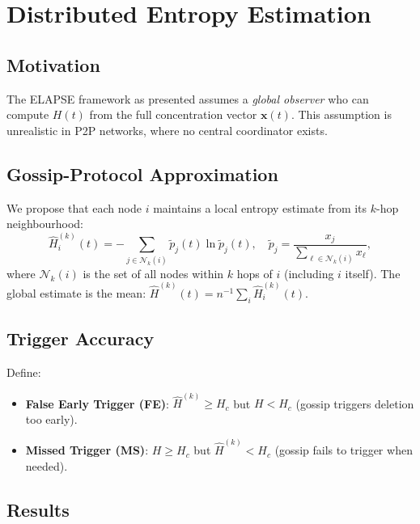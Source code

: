 \documentclass[review,12pt]{elsarticle}
\newcommand{\bfx}{\mathbf{x}}
\newcommand{\Hc}{H_c}
\begin{document}
\section{Distributed Entropy Estimation}
\label{sec:gossip}

\subsection{Motivation}

The ELAPSE framework as presented assumes a \emph{global observer} who can
compute $H(t)$ from the full concentration vector $\bfx(t)$. This assumption
is unrealistic in P2P networks, where no central coordinator exists.

\subsection{Gossip-Protocol Approximation}

We propose that each node $i$ maintains a local entropy estimate from its
$k$-hop neighbourhood:
\begin{equation}
  \hat{H}_i^{(k)}(t) = -\sum_{j \in \mathcal{N}_k(i)}
    \tilde{p}_j(t) \ln \tilde{p}_j(t),
  \quad
  \tilde{p}_j = \frac{x_j}{\sum_{\ell \in \mathcal{N}_k(i)} x_\ell},
  \label{eq:gossip_H}
\end{equation}
where $\mathcal{N}_k(i)$ is the set of all nodes within $k$ hops of $i$
(including $i$ itself). The global estimate is the mean:
$\hat{H}^{(k)}(t) = n^{-1}\!\sum_i \hat{H}_i^{(k)}(t)$.

\subsection{Trigger Accuracy}

Define:
\begin{itemize}
  \item \textbf{False Early Trigger (FE)}: $\hat{H}^{(k)} \geq \Hc$ but $H < \Hc$
        (gossip triggers deletion too early).
  \item \textbf{Missed Trigger (MS)}: $H \geq \Hc$ but $\hat{H}^{(k)} < \Hc$
        (gossip fails to trigger when needed).
\end{itemize}

\subsection{Results}
\end{document}
